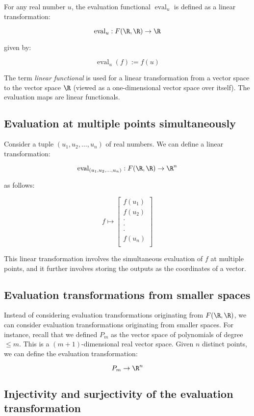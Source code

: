 \documentclass[10pt]{amsart}
\begin{document}
For any real number $u$, the evaluation functional
$\operatorname{eval}_u$ is defined as a linear transformation:

$$\operatorname{eval}_u: F(\R,\R) \to \R$$

given by:

$$\operatorname{eval}_u(f) := f(u)$$

The term {\em linear functional} is used for a linear transformation
from a vector space to the vector space $\R$ (viewed as a
one-dimensional vector space over itself). The evaluation maps are
linear functionals.

\subsection{Evaluation at multiple points simultaneously}

Consider a tuple $(u_1,u_2,\dots,u_n)$ of real numbers. We can define
a linear transformation:

$$\operatorname{eval}_{(u_1,u_2,\dots,u_n)}:F(\R,\R) \to \R^n$$

as follows:

$$f \mapsto \left[\begin{matrix} f(u_1) \\ f(u_2) \\ \cdot \\ \cdot \\ \cdot \\ f(u_n) \\\end{matrix}\right]$$

This linear transformation involves the simultaneous evaluation of $f$
at multiple points, and it further involves storing the outputs as the
coordinates of a vector.

\subsection{Evaluation transformations from smaller spaces}

Instead of considering evaluation transformations originating from
$F(\R,\R)$, we can consider evaluation transformations originating
from smaller spaces. For instance, recall that we defined $P_m$ as the
vector space of polynomials of degree $\le m$. This is a $(m +
1)$-dimensional real vector space. Given $n$ distinct points, we can
define the evaluation transformation:

$$P_m \to \R^n$$

\subsection{Injectivity and surjectivity of the evaluation transformation}
\end{document}
